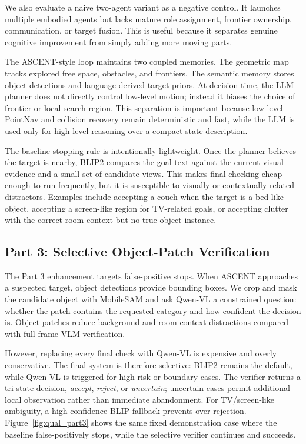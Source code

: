 \documentclass[10pt,twocolumn,letterpaper]{article}
\begin{document}
We also evaluate a naive two-agent variant as a negative control. It launches multiple embodied agents but lacks mature role assignment, frontier ownership, communication, or target fusion. This is useful because it separates genuine cognitive improvement from simply adding more moving parts.

The ASCENT-style loop maintains two coupled memories. The geometric map tracks explored free space, obstacles, and frontiers. The semantic memory stores object detections and language-derived target priors. At decision time, the LLM planner does not directly control low-level motion; instead it biases the choice of frontier or local search region. This separation is important because low-level PointNav and collision recovery remain deterministic and fast, while the LLM is used only for high-level reasoning over a compact state description.

The baseline stopping rule is intentionally lightweight. Once the planner believes the target is nearby, BLIP2 compares the goal text against the current visual evidence and a small set of candidate views. This makes final checking cheap enough to run frequently, but it is susceptible to visually or contextually related distractors. Examples include accepting a couch when the target is a bed-like object, accepting a screen-like region for TV-related goals, or accepting clutter with the correct room context but no true object instance.

\subsection{Part 3: Selective Object-Patch Verification}
The Part 3 enhancement targets false-positive stops. When ASCENT approaches a suspected target, object detections provide bounding boxes. We crop and mask the candidate object with MobileSAM and ask Qwen-VL a constrained question: whether the patch contains the requested category and how confident the decision is. Object patches reduce background and room-context distractions compared with full-frame VLM verification.

However, replacing every final check with Qwen-VL is expensive and overly conservative. The final system is therefore selective: BLIP2 remains the default, while Qwen-VL is triggered for high-risk or boundary cases. The verifier returns a tri-state decision, \emph{accept}, \emph{reject}, or \emph{uncertain}; uncertain cases permit additional local observation rather than immediate abandonment. For TV/screen-like ambiguity, a high-confidence BLIP fallback prevents over-rejection. Figure~\ref{fig:qual_part3} shows the same fixed demonstration case where the baseline false-positively stops, while the selective verifier continues and succeeds.
\end{document}

